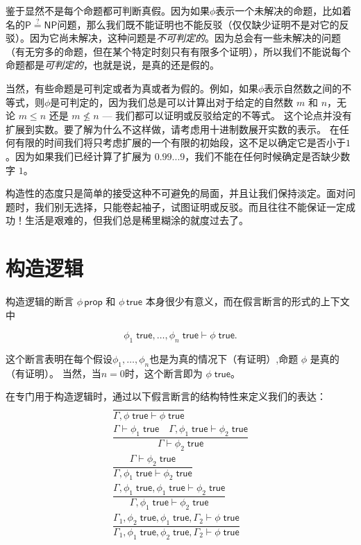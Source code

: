 鉴于显然不是每个命题都可判断真假。因为如果${\phi}$表示一个未解决的命题，比如着名的$\mathsf{P}\stackrel{?}{=}\mathsf{NP}$问题，那么我们既不能证明也不能反驳（仅仅缺少证明不是对它的反驳）。因为它尚未解决，这种问题是\textit{不可判定的}。因为总会有一些未解决的问题（有无穷多的命题，但在某个特定时刻只有有限多个证明），所以我们不能说每个命题都是\textit{可判定的}，也就是说，是真的还是假的。


当然，有些命题是可判定或者为真或者为假的。例如，如果${\phi}$表示自然数之间的不等式，则${\phi}$是可判定的，因为我们总是可以计算出对于给定的自然数
$m$ 和 $n$，无论 $m \leq n$ 还是 $m \not\leq n$ --- 我们都可以证明或反驳给定的不等式。
这个论点并没有扩展到实数。要了解为什么不这样做，请考虑用十进制数展开实数的表示。
在任何有限的时间我们将只考虑扩展的一个有限的初始段，这不足以确定它是否小于$1$ 。因为如果我们已经计算了扩展为
$0.99...9$，我们不能在任何时候确定是否缺少数字 $1$。


构造性的态度只是简单的接受这种不可避免的局面，并且让我们保持淡定。面对问题时，我们别无选择，只能卷起袖子，试图证明或反驳。而且往往不能保证一定成功！生活是艰难的，但我们总是稀里糊涂的就度过去了。
\section{构造逻辑}
构造逻辑的断言 $\phi\,\mathsf{prop}$ 和 $\phi\,\mathsf{true}$ 本身很少有意义，而在假言断言的形式的上下文中

$$\phi_1\;\mathsf{true}, \ldots, \phi_n \; \mathsf{true} \vdash \phi \; \mathsf{true}.$$


这个断言表明在每个假设$\phi_1, \ldots, \phi_n$也是为真的情况下（有证明）,命题 $\phi$ 是真的（有证明）。 当然，当$n = 0$时，这个断言即为 $\phi \; \mathsf{true}$。

在专门用于构造逻辑时，通过以下假言断言的结构特性来定义我们的表达：
\begin{subequations}
    \begin{gather}
       \dfrac{}
             {\Gamma,\phi\; \mathsf{true} \vdash \phi\; \mathsf{true}} \\
       \dfrac{\Gamma \vdash \phi_1\; \mathsf{true}\quad\Gamma,\phi_1\; \mathsf{true} \vdash \phi_2\; \mathsf{true}}
             {\Gamma \vdash \phi_2\; \mathsf{true}} \\
       \dfrac{\Gamma \vdash \phi_2\; \mathsf{true}}
             {\Gamma,\phi_1\; \mathsf{true} \vdash \phi_2\; \mathsf{true}} \\
       \dfrac{\Gamma,\phi_1\; \mathsf{true},\phi_1\; \mathsf{true} \vdash \phi_2\; \mathsf{true}}
             {\Gamma,\phi_1\; \mathsf{true} \vdash \phi_2\;  \mathsf{true}} \\
       \dfrac{\Gamma_1,\phi_2\; \mathsf{true},\phi_1\; \mathsf{true},\Gamma_2 \vdash \phi\; \mathsf{true}}
              {\Gamma_1,\phi_1\; \mathsf{true},\phi_2\; \mathsf{true},\Gamma_2 \vdash \phi\; \mathsf{true}}
    \end{gather}
\end{subequations}

